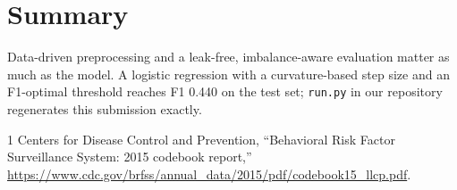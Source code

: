 \documentclass[10pt,conference,compsocconf]{IEEEtran}
\begin{document}
\section{Summary}

Data-driven preprocessing and a leak-free, imbalance-aware evaluation matter
as much as the model. A logistic regression with a curvature-based step size
and an F1-optimal threshold reaches F1 0.440 on the test set; \texttt{run.py}
in our repository regenerates this submission exactly.

\begin{thebibliography}{1}
Centers for Disease Control and Prevention, ``Behavioral Risk Factor
Surveillance System: 2015 codebook report,''
\url{https://www.cdc.gov/brfss/annual_data/2015/pdf/codebook15_llcp.pdf}.
\end{thebibliography}
\end{document}
